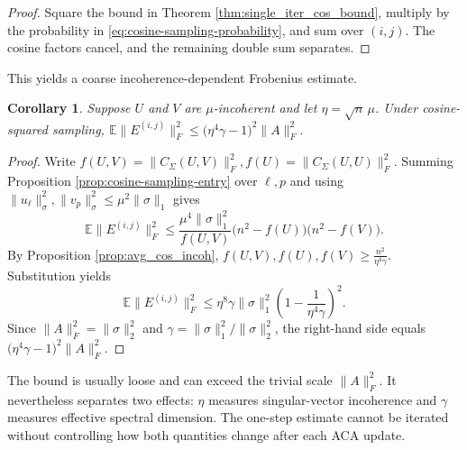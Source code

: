 \documentclass[11pt, preprint]{article}
\newtheorem{corollary}[theorem]{Corollary}
\newcommand{\Exp}{\mathbb{E}}
\begin{document}
\begin{proof}
Square the bound in Theorem \ref{thm:single_iter_cos_bound}, multiply by the probability in \eqref{eq:cosine-sampling-probability}, and sum over $(i,j)$. The cosine factors cancel, and the remaining double sum separates.
\end{proof}

This yields a coarse incoherence-dependent Frobenius estimate.

\begin{corollary}\label{corr:cosine-sampling-incoherent}
Suppose $U$ and $V$ are $\mu$-incoherent and let
$\eta=\sqrt n\,\mu$. Under cosine-squared sampling,
\(\Exp\|E^{(i,j)}\|_F^2\leq\big(\eta^4\gamma-1\big)^2\|A\|_F^2.
\)
\end{corollary}

\begin{proof}
Write \(f(U,V)=\|C_\Sigma(U,V)\|_F^2, f(U)=\|C_\Sigma(U,U)\|_F^2. \)
Summing Proposition \ref{prop:cosine-sampling-entry} over $\ell,p$ and using $\|u_\ell\|_\sigma^2,\|v_p\|_\sigma^2\leq\mu^2\|\sigma\|_1$ gives
\[\Exp\|E^{(i,j)}\|_F^2\leq\frac{\mu^4\|\sigma\|_1^2}{f(U,V)}\big(n^2-f(U)\big)\big(n^2-f(V)\big).
\]
By Proposition \ref{prop:avg_cos_incoh},
\(f(U,V),f(U),f(V)\geq\frac{n^2}{\eta^4\gamma}.
\)
Substitution yields
\[
\Exp\|E^{(i,j)}\|_F^2
\leq
\eta^8\gamma\|\sigma\|_1^2
\left(1-\frac{1}{\eta^4\gamma}\right)^2.
\]
Since $\|A\|_F^2=\|\sigma\|_2^2$ and
$\gamma=\|\sigma\|_1^2/\|\sigma\|_2^2$, the right-hand side equals
$\big(\eta^4\gamma-1\big)^2\|A\|_F^2$.
\end{proof}


The bound is usually loose and can exceed the trivial scale $\|A\|_F^2$. It nevertheless separates two effects: $\eta$ measures singular-vector incoherence and $\gamma$ measures effective spectral dimension. The one-step estimate cannot be iterated without controlling how both quantities change after each ACA update.
\end{document}

